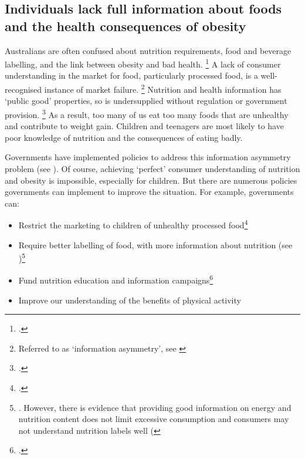 \documentclass[embargoed]{grattan}
\begin{document}
\subsection{Individuals lack full information about foods and the health consequences of obesity }\label{individuals-lack-full-information-about-foods-and-the-health-consequences-of-obesity}

Australians are often confused about nutrition requirements, food and beverage labelling, and the link between obesity and bad health.%
\footcites{Baker2014Fatnationwhy}{Karnani2016ObesityCrisisas} A lack of consumer understanding in the market for food, particularly processed food, is a well-recognised instance of market failure.%
\footnote{Referred to as `information asymmetry', see \textcites{Karnani2016ObesityCrisisas}{Freebairn2010Taxationobesity}} Nutrition and health information has `public good' properties, so is undersupplied without regulation or government provision.%
\footcite{Freebairn2010Taxationobesity} As a result, too many of us eat too many foods that are unhealthy and contribute to weight gain.
Children and teenagers are most likely to have poor knowledge of nutrition and the consequences of eating badly.

Governments have implemented policies to address this information asymmetry problem (see ).
Of course, achieving `perfect' consumer understanding of nutrition and obesity is impossible, especially for children.
But there are numerous policies governments can implement to improve the situation.
For example, governments can:

\begin{itemize}
\item
  Restrict the marketing to children of unhealthy processed food\footcites{Organization2016Reportcommissionending}{Cairns2013Systematicreviewsevidence}{Magnus2009costeffectivenessremoving}{Chou2005Fastfoodrestaurant}{Boyland2011Foodcommercialsincrease}{Capacci2012Policiespromotehealthy}
\item
  Require better labelling of food, with more information about nutrition (see )\footnote{\textcites{MacKay2011Legislativesolutionsunhealthy}{Freebairn2010Taxationobesity}{Capacci2012Policiespromotehealthy}{Roberto2012Factsfrontversus}{Restrepo2014Calorielabelingchain}{Magnusson2010Obesitypreventionpersonal}{Cowburn2005Consumerunderstandinguse}{Hawley2013sciencefrontpackage}{Mejean2014Associationperceptionfront}.
However, there is evidence that providing good information on energy and nutrition content does not limit excessive consumption and consumers may not understand nutrition labels well (\textcites{Downs2009Strategiespromotinghealthier}{Cowburn2005Consumerunderstandinguse}{Watson2013Howwelldo}}
\item
  Fund nutrition education and information campaigns\footcites{Organization2016Reportcommissionending}{Capacci2012Policiespromotehealthy}{Hawkes2013Promotinghealthydiets}{Pettigrew2013Consumersinabilityestimate}{Liquori1998CookshopProgramoutcome}
\item
  Improve our understanding of the benefits of physical activity
 \end{itemize}
\end{document}
